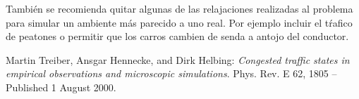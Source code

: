\documentclass[colorinlistoftodos,twoside,twocolumn]{article} %
\begin{document}
	Tambi\'en se recomienda quitar algunas de las relajaciones realizadas al problema para simular un ambiente m\'as parecido  a uno real. Por ejemplo incluir el t\'rafico de peatones o permitir que los carros cambien de senda a antojo del conductor.
	
	\listoftodos

\begin{thebibliography}{20}
	 Martin Treiber, Ansgar Hennecke, and Dirk Helbing: \emph{Congested traffic states in empirical observations and microscopic simulations}. Phys. Rev. E 62, 1805 – Published 1 August 2000.
\end{thebibliography}
\end{document}
